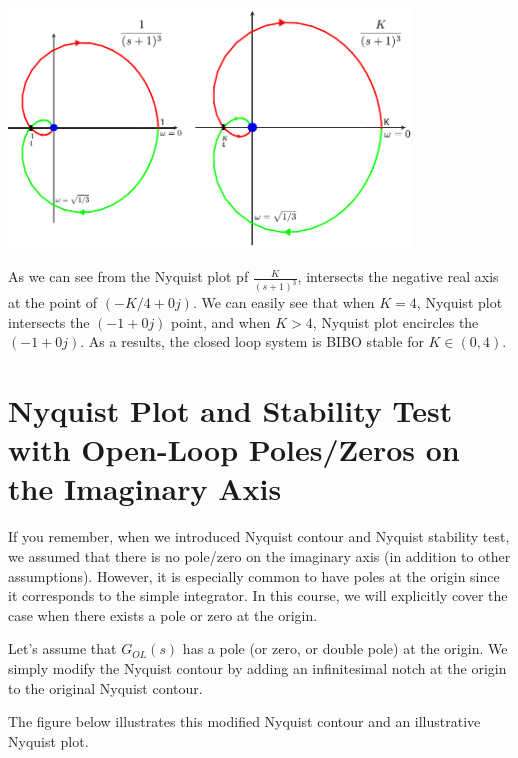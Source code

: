 \documentclass{article}
\begin{document}
  \begin{minipage}[h]{1\linewidth}
    \begin{center}
      \includegraphics[width=0.8\textwidth]{figs/exK2}
    \end{center}
  \end{minipage}

\vspace{6 pt}

As we can see from the Nyquist plot pf $\frac{K}{(s+1)^3}$, 
intersects the negative real axis at the point of $(-K/4 + 0 j)$.
We can easily see that when $K = 4$, Nyquist plot intersects 
the $(-1 + 0 j)$ point, and when $K > 4$, Nyquist plot encircles 
the $(-1 + 0 j)$. As a results, the closed loop system is BIBO
stable for $K \in (0 , 4)$.
 
\section*{Nyquist Plot and Stability Test with  Open-Loop Poles/Zeros on the Imaginary Axis}

If you remember, when we introduced Nyquist contour and Nyquist stability test, we assumed that there is no pole/zero on the imaginary axis (in addition to other assumptions). However, it is especially common to have poles at the origin since it corresponds to the simple integrator. In this course, we will explicitly cover the case when there exists a pole or zero at the origin.

Let's assume that $G_{OL}(s)$ has a pole (or zero, or double pole)
at the origin. We simply modify the Nyquist contour by adding an
infinitesimal notch at the origin to the original Nyquist contour. 

The figure below illustrates this modified Nyquist contour and 
an illustrative Nyquist plot. 

\vspace{12 pt}
\end{document}
